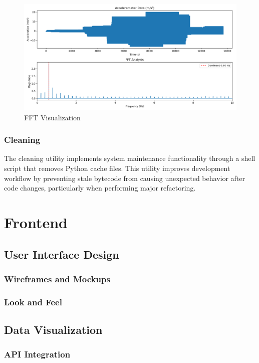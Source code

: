 \documentclass{article}
\begin{document}
    \begin{figure} [h]
        \centering
        \includegraphics[width=1\linewidth]{assets/fft_visualization.png}
        \caption{FFT Visualization}
        \label{fig:enter-label}
    \end{figure}

    \subsubsection{Cleaning}
    The cleaning utility implements system maintenance functionality through a shell script that removes Python cache files. This utility improves development workflow by preventing stale bytecode from causing unexpected behavior after code changes, particularly when performing major refactoring.

\section{Frontend}
\subsection{User Interface Design}
    \subsubsection{Wireframes and Mockups}
    \subsubsection{Look and Feel}
\subsection{Data Visualization}
    \subsubsection{API Integration}
\end{document}
